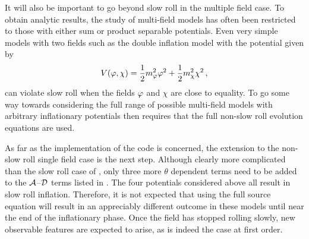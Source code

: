 It will also be important to go beyond slow roll in the multiple field case.
To obtain analytic results, the study of multi-field models has often been restricted to those with
either sum or product separable potentials. Even very simple
models with two fields such as the double inflation model with the potential given by
\cite{Turner:1986te, Silk:1986vc}
% 
\begin{equation}
 V(\varphi,\chi) = \frac{1}{2}m_{\varphi}^2\varphi^2 + \frac{1}{2}m_\chi^2 \chi^2\,,
\end{equation}
% 
can violate slow roll when the fields $\varphi$ and $\chi$ are close to
equality. To go some way towards considering the full range of possible multi-field models with
arbitrary inflationary potentials then requires that the full non-slow roll evolution equations are
used.


As far as the implementation of the code is concerned, the extension to the non-slow roll single
field case is the next step.
Although clearly
more complicated than the slow roll case of ,
only three more $\theta$ dependent terms need to be added to the $\mathcal{A}$--$\mathcal{D}$ terms
listed in .  The four potentials considered above all result in 
slow roll inflation. Therefore, it is not expected that
using the full source equation will result in an appreciably
different outcome in these models until near the end of the inflationary phase. Once
the field has stopped rolling slowly, new observable features are expected to
arise, as is indeed the case at first order. 

 

